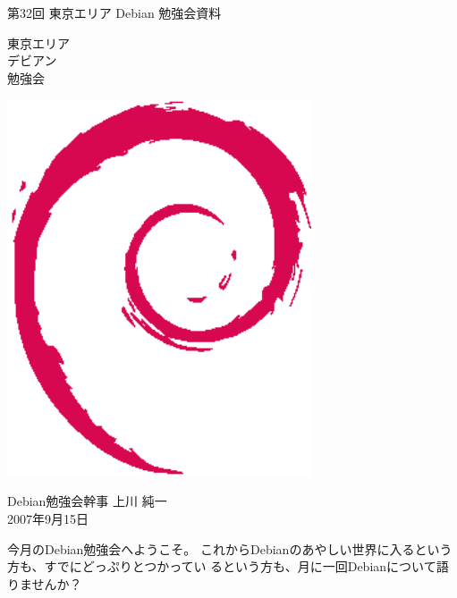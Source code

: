 \documentclass[mingoth,a4paper]{jsarticle}
\newcommand{\debmtgyear}{2007}
\newcommand{\debmtgdate}{15}
\newcommand{\debmtgmonth}{9}
\newcommand{\debmtgnumber}{32}
\begin{document}
\begin{titlepage}


 第\debmtgnumber{}回 東京エリア Debian 勉強会資料

\vspace{2cm}

\begin{minipage}[t]{0.6\hsize}
\vspace{-2cm}
{\fontsize{60}{60}
{\gt
\color{dancerdarkblue}
東京エリア \\
デビアン \\
勉強会
}}
\end{minipage}
\begin{minipage}[b]{0.4\hsize}
\hspace{-1cm}\includegraphics[width=9cm]{image200502/openlogo-nd.eps}
\end{minipage}

\vspace{3cm}
\hfill{}Debian勉強会幹事 上川 純一\\
\hfill{}\debmtgyear{}年\debmtgmonth{}月\debmtgdate{}日

\thispagestyle{empty}
\end{titlepage}



今月のDebian勉強会へようこそ。
 これからDebianのあやしい世界に入るという方も、すでにどっぷりとつかってい
 るという方も、月に一回Debianについて語りませんか？
\end{document}

